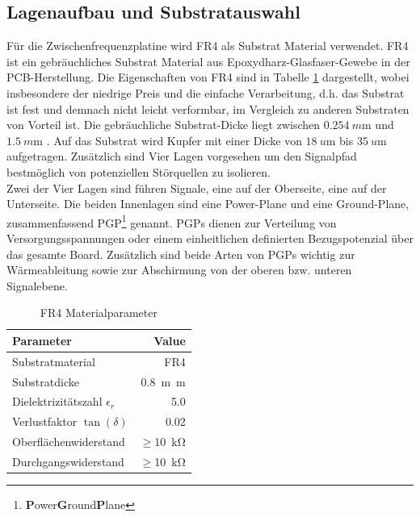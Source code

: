 \subsection{Lagenaufbau und Substratauswahl}
Für die Zwischenfrequenzplatine wird FR4 als Substrat Material verwendet. FR4 ist ein gebräuchliches Substrat Material aus Epoxydharz-Glasfaser-Gewebe in der PCB-Herstellung. Die Eigenschaften von FR4 sind in Tabelle \ref{tab:FR4} dargestellt, wobei insbesondere der niedrige Preis und die einfache Verarbeitung, d.h. das Substrat ist fest und demnach nicht leicht verformbar, im Vergleich zu anderen Substraten von Vorteil ist. Die gebräuchliche Substrat-Dicke liegt zwischen  $\SI{0.254}{m\meter}$  und $\SI{1.5}{m\meter}$ . Auf das Substrat wird Kupfer mit einer Dicke von $\SI{18}{u\meter}$ bis $\SI{35}{u\meter}$ aufgetragen. Zusätzlich sind Vier Lagen vorgesehen um den Signalpfad bestmöglich von potenziellen Störquellen zu isolieren.\\
Zwei der Vier Lagen sind führen Signale, eine auf der Oberseite, eine auf der Unterseite. Die beiden Innenlagen sind eine Power-Plane und eine Ground-Plane, zusammenfassend PGP\footnote{\textbf{P}ower\textbf{G}round\textbf{P}lane} genannt.  PGPs dienen zur Verteilung von Versorgungsspannungen oder einem einheitlichen definierten Bezugspotenzial über das gesamte Board. Zusätzlich sind beide Arten von PGPs wichtig zur Wärmeableitung sowie zur Abschirmung von der oberen bzw. unteren Signalebene. 
\begin{table}[tbp]
  \centering
  \begin{tabular}{lr}
    Parameter                               & Value\\
    \hline
    Substratmaterial        & FR4\\
    Substratdicke                           & \SI{0.8}{m\meter}\\
    Dielektrizitätszahl $\epsilon_{r}$ & 5.0 \\
    Verlustfaktor $\tan \left( \delta \right)$ & 0.02 \\
    Oberflächenwiderstand & $\geq$\SI{10}{\kilo\ohm} \\
    Durchgangswiderstand & $\geq$\SI{10}{\kilo\ohm} \\
  \end{tabular}
  \caption{FR4 Materialparameter}
  \label{tab:FR4}
\end{table}
